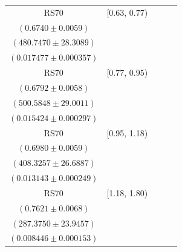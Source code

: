 {\begin{longtable}{|c|c|c|c|c|}
RS70 & [0.63, 0.77) & \begin{tabular}{@{}c@{}}$0.6984 \pm 0.0062$ \\ $(0.6740 \pm 0.0059)$\end{tabular} & \begin{tabular}{@{}c@{}}$463.8876 \pm 27.3161$ \\ $(480.7470 \pm 28.3089)$\end{tabular} & \begin{tabular}{@{}c@{}}$0.016688 \pm 0.000465$ \\ $(0.017477 \pm 0.000357)$\end{tabular} \\ \hline
RS70 & [0.77, 0.95) & \begin{tabular}{@{}c@{}}$0.6955 \pm 0.0063$ \\ $(0.6792 \pm 0.0058)$\end{tabular} & \begin{tabular}{@{}c@{}}$488.8491 \pm 28.3212$ \\ $(500.5848 \pm 29.0011)$\end{tabular} & \begin{tabular}{@{}c@{}}$0.014926 \pm 0.000387$ \\ $(0.015424 \pm 0.000297)$\end{tabular} \\ \hline
RS70 & [0.95, 1.18) & \begin{tabular}{@{}c@{}}$0.6840 \pm 0.0067$ \\ $(0.6980 \pm 0.0059)$\end{tabular} & \begin{tabular}{@{}c@{}}$416.6742 \pm 27.2343$ \\ $(408.3257 \pm 26.6887)$\end{tabular} & \begin{tabular}{@{}c@{}}$0.012947 \pm 0.000333$ \\ $(0.013143 \pm 0.000249)$\end{tabular} \\ \hline
RS70 & [1.18, 1.80) & \begin{tabular}{@{}c@{}}$0.6885 \pm 0.0078$ \\ $(0.7621 \pm 0.0068)$\end{tabular} & \begin{tabular}{@{}c@{}}$318.0774 \pm 26.5040$ \\ $(287.3750 \pm 23.9457)$\end{tabular} & \begin{tabular}{@{}c@{}}$0.008756 \pm 0.000206$ \\ $(0.008446 \pm 0.000153)$\end{tabular} \\ \hline
\end{longtable}
}
